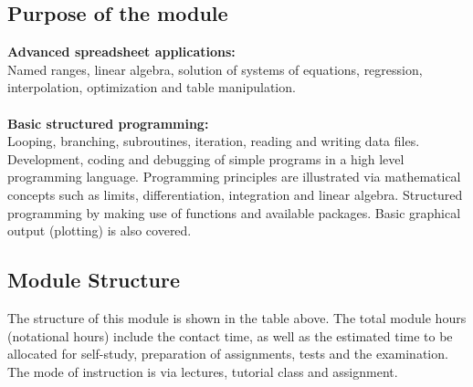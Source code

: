     \subsection{Purpose of the module}
        {\bf Advanced spreadsheet applications:} \\
        Named ranges, linear algebra,
        solution of systems of equations, regression, interpolation,
        optimization and table manipulation. \\ \\
        {\bf Basic structured programming:} \\
        Looping, branching, subroutines, iteration, reading and writing data files.
        Development, coding and debugging of simple programs in a high level 
        programming language. Programming principles are illustrated via 
        mathematical concepts such as limits, differentiation, integration
        and linear algebra. Structured programming by making use of functions
        and available packages. Basic graphical output (plotting) is also
        covered.
    
    \subsection{Module Structure}
        The structure of this module is shown in the table above. The total module 
        hours (notational hours) include the contact time, as well as the estimated time to be 
        allocated for self-study, preparation of assignments,
        tests and the examination. The mode of instruction is via lectures,
        tutorial class and assignment.

